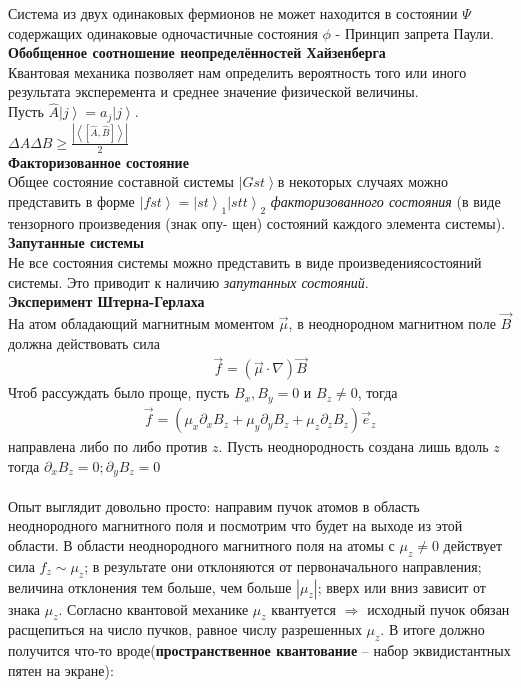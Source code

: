 \documentclass[__minimum__.tex]{subfiles}
\begin{document}
	Система из двух одинаковых фермионов не может находится в состоянии $\Psi$ содержащих одинаковые одночастичные состояния $\phi$ - Принцип запрета Паули.\\
	\textbf{Обобщенное соотношение неопределённостей Хайзенберга}\\
	Квантовая механика позволяет нам определить вероятность того или иного результата эксперемента и среднее значение физической величины.\\
	Пусть $\hat{A}\left|j\right> = a_j \left|j\right>$.\\
	$\Delta{A}\Delta{B}\ge\frac{\left|\left<\left[\hat{A},\hat{B}\right]\right>\right|}{2}$\\
	\textbf{Факторизованное состояние}\\
	Общее состояние составной системы $ \left|Gst\right>$в некоторых случаях можно представить в форме $\left|fst\right> = \left|st\right>_1\left|stt\right>_2$
	\textit{факторизованного состояния}  (в виде тензорного произведения (знак опу-
	щен) состояний каждого элемента системы).\\
	\textbf{Запутанные системы}\\
	Не все состояния системы можно представить в виде произведениясостояний системы. Это приводит к наличию \textit{запутанных состояний}.\\
	\textbf{Эксперимент Штерна-Герлаха}\\
	На атом обладающий магнитным моментом $\vec{\mu}$, в неоднородном магнитном поле $\vec{B}$ должна действовать сила
	\begin{gather*}
		\vec{f} = \left(\vec{\mu}\cdot\nabla\right)\vec{B}
	\end{gather*}
	Чтоб рассуждать было проще, пусть $B_x, B_y = 0$  и $B_z \neq 0$, тогда
	\begin{gather*}
		\vec{f} = \left(\mu_x\partial_xB_z+\mu_y\partial_yB_z+\mu_z\partial_zB_z\right)\vec{e}_z
	\end{gather*}
	направлена либо по либо против $z$. Пусть неоднородность создана лишь вдоль $z$ тогда $\partial_xB_z=0; \partial_yB_z=0$\\\\
	Опыт выглядит довольно просто: направим пучок атомов в область неоднородного магнитного поля и посмотрим что будет на выходе из этой области.
	В области неоднородного магнитного поля на атомы с $\mu_z \neq 0$ действует сила $f_z \sim \mu_z$; в результате они отклоняются от первоначального направления; величина отклонения тем больше, чем больше $|\mu_z|$; вверх или вниз зависит от знака $\mu_z$.
	Согласно квантовой механике $\mu_z$ квантуется $\Rightarrow$ исходный пучок обязан расщепиться на число пучков, равное числу разрешенных $\mu_z$. В итоге должно получится что-то вроде(\textbf{пространственное квантование} -- набор эквидистантных пятен на экране):
\end{document}
